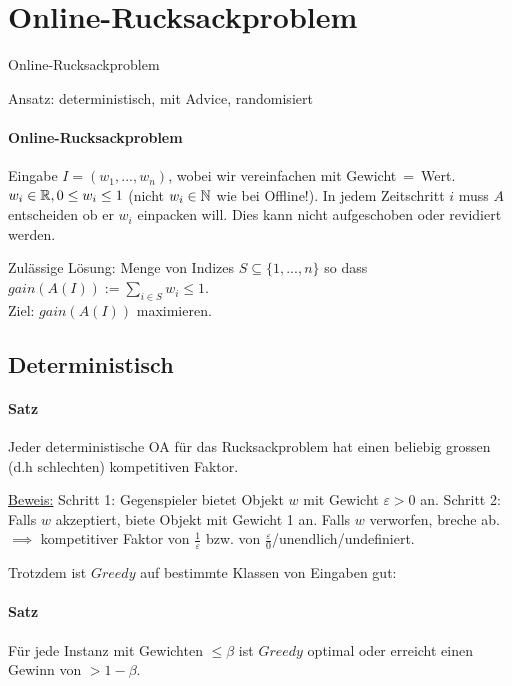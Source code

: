 \section{Online-Rucksackproblem}

\begin{takeaway}
    \item Online-Rucksackproblem
    \item Ansatz: deterministisch, mit Advice, randomisiert
\end{takeaway}

\paragraph{Online-Rucksackproblem}
Eingabe $I=(w_1, ..., w_n)$, wobei wir vereinfachen mit \mbox{Gewicht = Wert}.
$w_i \in \mathbb{R}, 0 \leq w_i \leq 1$ (nicht $w_i \in \mathbb{N}$ wie bei Offline!).
In jedem Zeitschritt $i$ muss $A$ entscheiden ob er $w_i$ einpacken will.
Dies kann nicht aufgeschoben oder revidiert werden.

Zulässige Lösung: Menge von Indizes $S \subseteq \{1, ..., n\}$ so dass
$gain(A(I)) := \sum_{i \in S} w_i \leq 1$.
\\
Ziel: $gain(A(I))$ maximieren.


\subsection{Deterministisch}

\paragraph{Satz}
Jeder deterministische OA für das Rucksackproblem hat einen beliebig grossen (d.h schlechten)
kompetitiven Faktor.

\underline{Beweis:}
Schritt 1: Gegenspieler bietet Objekt $w$ mit Gewicht $\varepsilon > 0$ an.
Schritt 2: Falls $w$ akzeptiert, biete Objekt mit Gewicht 1 an. Falls $w$ verworfen, breche ab.
\\
$\implies$ kompetitiver Faktor von $\frac{1}{\varepsilon}$ bzw. von
$\frac{\varepsilon}{0}$/unendlich/undefiniert.

\vspace{5mm}

Trotzdem ist $Greedy$ auf bestimmte Klassen von Eingaben gut:

\paragraph{Satz}
Für jede Instanz mit Gewichten $\leq \beta$ ist $Greedy$ optimal oder erreicht einen Gewinn von $> 1-\beta$.

